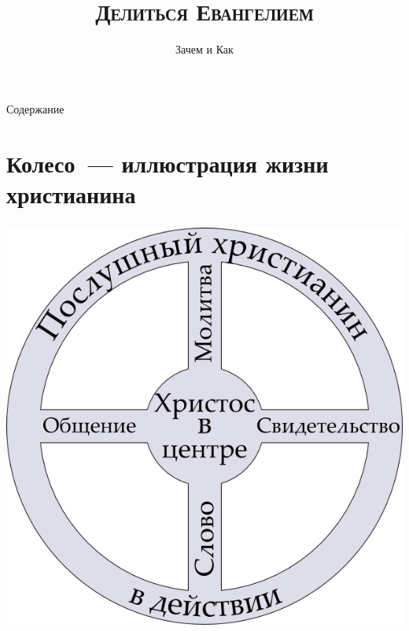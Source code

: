 \documentclass[t,aspectratio=169,14pt]{beamer}  %
\title{\textsc{\textbf{Делиться Евангелием}}}
\subtitle{Зачем и Как}
\author[Библейская Церковь СПб]{}
\date{}
\begin{document}
\frame[plain]{\titlepage}	%
\begin{frame}{Содержание}
    \tableofcontents[hideallsubsections]
\end{frame}
\section{Колесо~--- иллюстрация жизни христианина}
\begin{frame}[c]
\frametitle{\insertsection}
	\begin{multicols*}{2}
	\includegraphics[height=0.8\textheight]{wheel.png}
	\columnbreak
	\pause
\end{multicols*}
\end{frame}
\end{document}
